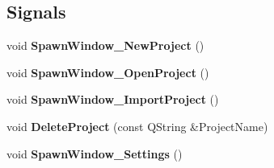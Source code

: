 \subsection*{Signals}
\begin{DoxyCompactItemize}
\item 
void {\bfseries Spawn\+Window\+\_\+\+New\+Project} ()\hypertarget{class_project_management_aa4dd6bcf61df483fffc874924b606054}{}\label{class_project_management_aa4dd6bcf61df483fffc874924b606054}

\item 
void {\bfseries Spawn\+Window\+\_\+\+Open\+Project} ()\hypertarget{class_project_management_aec165ff7b4af77097ba2b90a002cc290}{}\label{class_project_management_aec165ff7b4af77097ba2b90a002cc290}

\item 
void {\bfseries Spawn\+Window\+\_\+\+Import\+Project} ()\hypertarget{class_project_management_a63d45c6b78ee7922481cf2ba4325c1ce}{}\label{class_project_management_a63d45c6b78ee7922481cf2ba4325c1ce}

\item 
void {\bfseries Delete\+Project} (const Q\+String \&Project\+Name)\hypertarget{class_project_management_a8e3d69e893ea389d5e12aa51c01f4577}{}\label{class_project_management_a8e3d69e893ea389d5e12aa51c01f4577}

\item 
void {\bfseries Spawn\+Window\+\_\+\+Settings} ()\hypertarget{class_project_management_ad43fe6ca8c06db921d29c0740baca79a}{}\label{class_project_management_ad43fe6ca8c06db921d29c0740baca79a}

\end{DoxyCompactItemize}
